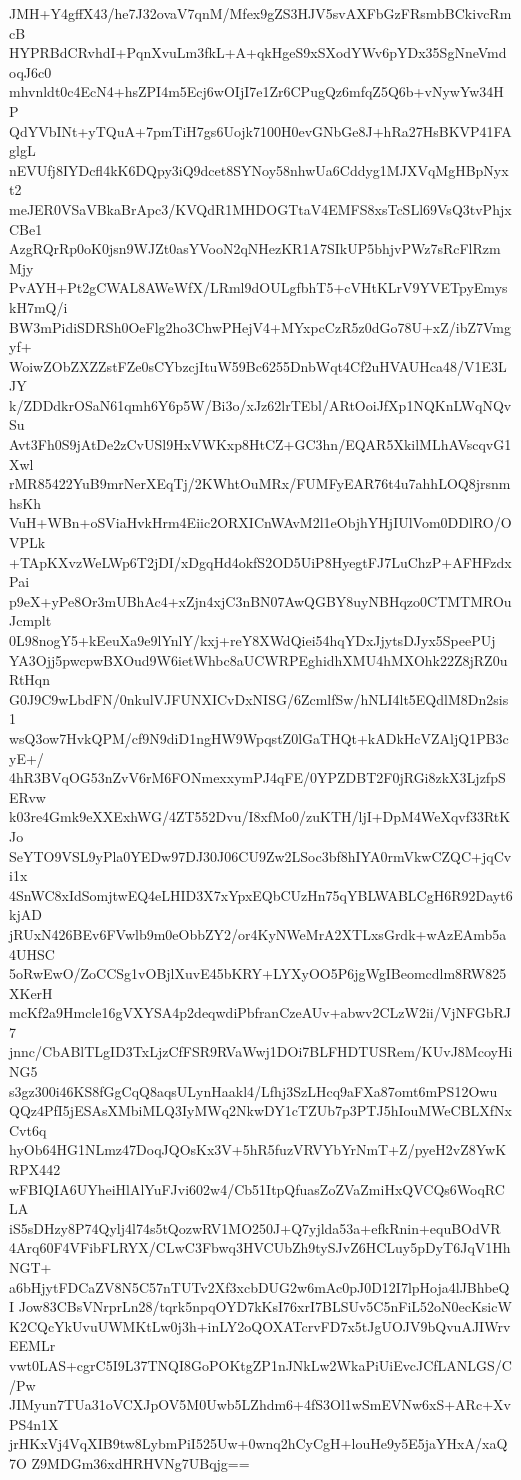JMH+Y4gffX43/he7J32ovaV7qnM/Mfex9gZS3HJV5svAXFbGzFRsmbBCkivcRmcB
HYPRBdCRvhdI+PqnXvuLm3fkL+A+qkHgeS9xSXodYWv6pYDx35SgNneVmdoqJ6c0
mhvnldt0c4EcN4+hsZPI4m5Ecj6wOIjI7e1Zr6CPugQz6mfqZ5Q6b+vNywYw34HP
QdYVbINt+yTQuA+7pmTiH7gs6Uojk7100H0evGNbGe8J+hRa27HsBKVP41FAglgL
nEVUfj8IYDcfl4kK6DQpy3iQ9dcet8SYNoy58nhwUa6Cddyg1MJXVqMgHBpNyxt2
meJER0VSaVBkaBrApc3/KVQdR1MHDOGTtaV4EMFS8xsTcSLl69VsQ3tvPhjxCBe1
AzgRQrRp0oK0jsn9WJZt0asYVooN2qNHezKR1A7SIkUP5bhjvPWz7sRcFlRzmMjy
PvAYH+Pt2gCWAL8AWeWfX/LRml9dOULgfbhT5+cVHtKLrV9YVETpyEmyskH7mQ/i
BW3mPidiSDRSh0OeFlg2ho3ChwPHejV4+MYxpcCzR5z0dGo78U+xZ/ibZ7Vmgyf+
WoiwZObZXZZstFZe0sCYbzcjItuW59Bc6255DnbWqt4Cf2uHVAUHca48/V1E3LJY
k/ZDDdkrOSaN61qmh6Y6p5W/Bi3o/xJz62lrTEbl/ARtOoiJfXp1NQKnLWqNQvSu
Avt3Fh0S9jAtDe2zCvUSl9HxVWKxp8HtCZ+GC3hn/EQAR5XkilMLhAVscqvG1Xwl
rMR85422YuB9mrNerXEqTj/2KWhtOuMRx/FUMFyEAR76t4u7ahhLOQ8jrsnmhsKh
VuH+WBn+oSViaHvkHrm4Eiic2ORXICnWAvM2l1eObjhYHjIUlVom0DDlRO/OVPLk
+TApKXvzWeLWp6T2jDI/xDgqHd4okfS2OD5UiP8HyegtFJ7LuChzP+AFHFzdxPai
p9eX+yPe8Or3mUBhAc4+xZjn4xjC3nBN07AwQGBY8uyNBHqzo0CTMTMROuJcmplt
0L98nogY5+kEeuXa9e9lYnlY/kxj+reY8XWdQiei54hqYDxJjytsDJyx5SpeePUj
YA3Ojj5pwcpwBXOud9W6ietWhbc8aUCWRPEghidhXMU4hMXOhk22Z8jRZ0uRtHqn
G0J9C9wLbdFN/0nkulVJFUNXICvDxNISG/6ZcmlfSw/hNLI4lt5EQdlM8Dn2sis1
wsQ3ow7HvkQPM/cf9N9diD1ngHW9WpqstZ0lGaTHQt+kADkHcVZAljQ1PB3cyE+/
4hR3BVqOG53nZvV6rM6FONmexxymPJ4qFE/0YPZDBT2F0jRGi8zkX3LjzfpSERvw
k03re4Gmk9eXXExhWG/4ZT552Dvu/I8xfMo0/zuKTH/ljI+DpM4WeXqvf33RtKJo
SeYTO9VSL9yPla0YEDw97DJ30J06CU9Zw2LSoc3bf8hIYA0rmVkwCZQC+jqCvi1x
4SnWC8xIdSomjtwEQ4eLHID3X7xYpxEQbCUzHn75qYBLWABLCgH6R92Dayt6kjAD
jRUxN426BEv6FVwlb9m0eObbZY2/or4KyNWeMrA2XTLxsGrdk+wAzEAmb5a4UHSC
5oRwEwO/ZoCCSg1vOBjlXuvE45bKRY+LYXyOO5P6jgWgIBeomcdlm8RW825XKerH
mcKf2a9Hmcle16gVXYSA4p2deqwdiPbfranCzeAUv+abwv2CLzW2ii/VjNFGbRJ7
jnnc/CbABlTLgID3TxLjzCfFSR9RVaWwj1DOi7BLFHDTUSRem/KUvJ8McoyHiNG5
s3gz300i46KS8fGgCqQ8aqsULynHaakl4/Lfhj3SzLHcq9aFXa87omt6mPS12Owu
QQz4PfI5jESAsXMbiMLQ3IyMWq2NkwDY1cTZUb7p3PTJ5hIouMWeCBLXfNxCvt6q
hyOb64HG1NLmz47DoqJQOsKx3V+5hR5fuzVRVYbYrNmT+Z/pyeH2vZ8YwKRPX442
wFBIQIA6UYheiHlAlYuFJvi602w4/Cb51ItpQfuasZoZVaZmiHxQVCQs6WoqRCLA
iS5sDHzy8P74Qylj4l74s5tQozwRV1MO250J+Q7yjlda53a+efkRnin+equBOdVR
4Arq60F4VFibFLRYX/CLwC3Fbwq3HVCUbZh9tySJvZ6HCLuy5pDyT6JqV1HhNGT+
a6bHjytFDCaZV8N5C57nTUTv2Xf3xcbDUG2w6mAc0pJ0D12I7lpHoja4lJBhbeQI
Jow83CBsVNrprLn28/tqrk5npqOYD7kKsI76xrI7BLSUv5C5nFiL52oN0ecKsicW
K2CQcYkUvuUWMKtLw0j3h+inLY2oQOXATcrvFD7x5tJgUOJV9bQvuAJIWrvEEMLr
vwt0LAS+cgrC5I9L37TNQI8GoPOKtgZP1nJNkLw2WkaPiUiEvcJCfLANLGS/C/Pw
JIMyun7TUa31oVCXJpOV5M0Uwb5LZhdm6+4fS3Ol1wSmEVNw6xS+ARc+XvPS4n1X
jrHKxVj4VqXIB9tw8LybmPiI525Uw+0wnq2hCyCgH+louHe9y5E5jaYHxA/xaQ7O
Z9MDGm36xdHRHVNg7UBqjg==
